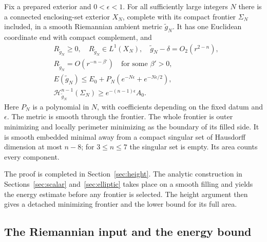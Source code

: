 \begin{theorem}\label{thm:prepared:deformation}
\label{prop:height:enclosure}
Fix a prepared exterior and $0<\epsilon<1$. For all sufficiently large
integers $N$ there is a connected enclosing-set exterior $X_N$, complete
with its compact frontier $\Sigma_N$ included, in a smooth Riemannian
ambient metric $\widetilde g_N$. It has one Euclidean coordinate end
with compact complement, and
\begin{equation}\label{eq:height:enclosure-estimates}
\begin{split}
 &R_{\widetilde g_N}\ge0,\quad R_{\widetilde g_N}\in L^1(X_N),
 \quad \widetilde g_N-\delta=O_2(r^{2-n}),\\
 &R_{\widetilde g_N}=O(r^{-n-\beta'})\quad\text{for some }\beta'>0,\\
 &E(\widetilde g_N)\le E_0+P_N(e^{-N\epsilon}+e^{-N\epsilon/2}),\\
 &\mathcal H^{n-1}_{\widetilde g_N}(\Sigma_N)
       \ge e^{-(n-1)\epsilon}A_0.
\end{split}
\end{equation}
Here $P_N$ is a polynomial in $N$, with coefficients depending on the
fixed datum and $\epsilon$. The metric is smooth through the frontier.
The whole frontier is outer minimizing and locally perimeter minimizing
as the boundary of its filled side. It is smooth embedded minimal away
from a compact singular set of Hausdorff dimension at most $n-8$; for
$3\le n\le7$ the singular set is empty. Its area counts every component.
\end{theorem}

The proof is completed in Section~\ref{sec:height}. The analytic
construction in Sections~\ref{sec:scalar} and~\ref{sec:elliptic} takes
place on a smooth filling and yields the energy estimate before any
frontier is selected. The height argument then gives a detached minimizing
frontier and the lower bound for its full area.

\subsection{The Riemannian input and the energy bound}

